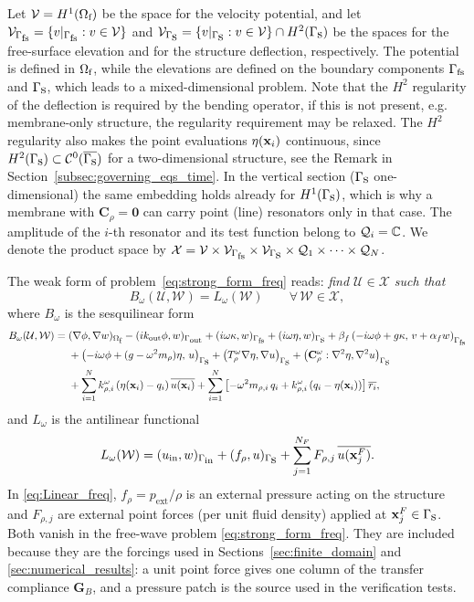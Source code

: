 Let $\mathcal{V}=H^1(\Omega_{\mbox{\scriptsize f}})$ be the space for the velocity potential, and let $\mathcal{V}_{\Gamma_{\mbox{\scriptsize fs}}}=\{v|_{\Gamma_{\mbox{\scriptsize fs}}}:v\in\mathcal{V}\}$ and $\mathcal{V}_{\Gamma_{\mbox{s}}}=\{v|_{\Gamma_{\mbox{s}}}:v\in\mathcal{V}\}\cap H^2(\Gamma_{\mbox{s}})$ be the spaces for the free-surface elevation and for the structure deflection, respectively. The potential is defined in $\Omega_{\mbox{\scriptsize f}}$, while the elevations are defined on the boundary components $\Gamma_{\mbox{\scriptsize fs}}$ and $\Gamma_{\mbox{s}}$, which leads to a mixed-dimensional problem. Note that the $H^2$ regularity of the deflection is required by the bending operator, if this is not present, e.g. membrane-only structure, the regularity requirement may be relaxed. The $H^2$ regularity also makes the point evaluations $\eta(\mathbf{x}_i)$ continuous, since $H^2(\Gamma_{\mbox{s}})\subset\mathcal{C}^0(\overline{\Gamma_{\mbox{s}}})$ for a two-dimensional structure, see the Remark in Section~\ref{subsec:governing_eqs_time}. In the vertical section ($\Gamma_{\mbox{s}}$ one-dimensional) the same embedding holds already for $H^1(\Gamma_{\mbox{s}})$, which is why a membrane with $\mathbf{C}_\rho=\mathbf{0}$ can carry point (line) resonators only in that case. The amplitude of the $i$-th resonator and its test function belong to $\mathcal{Q}_i=\mathbb{C}$. We denote the product space by $\mathcal{X}=\mathcal{V}\times\mathcal{V}_{\Gamma_{\mbox{\scriptsize fs}}}\times\mathcal{V}_{\Gamma_{\mbox{s}}}\times\mathcal{Q}_1\times\cdots\times\mathcal{Q}_N$.

The weak form of problem~\eqref{eq:strong_form_freq} reads: \textit{find $\mathcal{U}\in\mathcal{X}$ such that}
\begin{equation}\label{eq:weakform_freq}
    B_\omega(\mathcal{U},\mathcal{W}) = L_\omega(\mathcal{W})\qquad\forall\,\mathcal{W}\in\mathcal{X},
\end{equation}
where $B_\omega$ is the sesquilinear form
\begin{align}
    \label{eq:Bilinear_freq}
    B_\omega(\mathcal{U},\mathcal{W}) ={}&
    (\nabla\phi,\nabla w)_{\Omega_{\mbox{\scriptsize f}}}
    -(ik_{\mathrm{out}}\phi,w)_{\Gamma_{\mbox{\scriptsize out}}}
    +(i\omega\kappa,w)_{\Gamma_{\mbox{\scriptsize fs}}}
    +(i\omega\eta,w)_{\Gamma_{\mbox{s}}}
    +\beta_f\left(-i\omega\phi+g\kappa,\,v+\alpha_f w\right)_{\Gamma_{\mbox{\scriptsize fs}}}\\\nonumber
    &+\left(-i\omega\phi+(g-\omega^2m_\rho)\eta,\,u\right)_{\Gamma_{\mbox{s}}}
    +\left(T_\rho^\omega\nabla\eta,\nabla u\right)_{\Gamma_{\mbox{s}}}
    +\left(\mathbf{C}_\rho^\omega:\nabla^2\eta,\nabla^2u\right)_{\Gamma_{\mbox{s}}}\\\nonumber
    &+\sum_{i=1}^N k_{\rho,i}^\omega\left(\eta(\mathbf{x}_i)-q_i\right)\overline{u(\mathbf{x}_i)}
    +\sum_{i=1}^N\left[-\omega^2m_{\rho,i}\,q_i+k_{\rho,i}^\omega\left(q_i-\eta(\mathbf{x}_i)\right)\right]\overline{r_i},
\end{align}
and $L_\omega$ is the antilinear functional
\begin{equation}\label{eq:Linear_freq}
    L_\omega(\mathcal{W}) = (u_{\text{\scriptsize in}}, w)_{\Gamma_{\mbox{\scriptsize in}}} + (f_\rho,u)_{\Gamma_{\mbox{s}}} + \sum_{j=1}^{N_F}F_{\rho,j}\,\overline{u(\mathbf{x}_j^F)}.
\end{equation}
In \eqref{eq:Linear_freq}, $f_\rho=p_{\mathrm{ext}}/\rho$ is an external pressure acting on the structure and $F_{\rho,j}$ are external point forces (per unit fluid density) applied at $\mathbf{x}_j^F\in\Gamma_{\mbox{s}}$. Both vanish in the free-wave problem \eqref{eq:strong_form_freq}. They are included because they are the forcings used in Sections~\ref{sec:finite_domain} and \ref{sec:numerical_results}: a unit point force gives one column of the transfer compliance $\mathbf{G}_B$, and a pressure patch is the source used in the verification tests.


